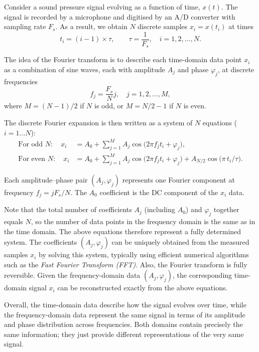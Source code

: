 \documentclass[12pt,a4paper]{article}
\begin{document}
Consider a sound pressure signal evolving as a function of time, $x(t)$. The signal is recorded by a microphone and digitised by an A/D converter with sampling rate \(F_s\). As a result, we obtain $N$ discrete samples $x_i = x(t_i)$ at times
\[
t_i = (i-1) \times \tau, \qquad \tau = \frac{1}{F_s}, \quad i = 1, 2, \ldots, N.
\]

The idea of the Fourier transform is to describe each time-domain data point \(x_i\)
as a combination of sine waves, each with amplitude \(A_j\) and phase \(\varphi_j\),
at discrete frequencies
\[
f_j = \frac{F_s}{N}j, \quad j = 1, 2, \ldots, M,
\]
where \(M = (N - 1)/2\) if \(N\) is odd, or \(M = N/2 - 1\) if \(N\) is even.

The discrete Fourier expansion is then written as a system of $N$ equations ($i = 1\ldots N$):
\begin{align}
\text{For odd } N:\quad
x_i &= A_0 + \sum_{j=1}^{M} A_j \cos\!\big(2\pi f_j t_i + \varphi_j\big), \\[6pt]
\text{For even } N:\quad
x_i &= A_0 + \sum_{j=1}^{M} A_j \cos\!\big(2\pi f_j t_i + \varphi_j\big)
      + A_{N/2}\cos\!\big(\pi\, t_i / \tau\big).
\end{align}

Each amplitude–phase pair \((A_j, \varphi_j)\) represents one Fourier component at frequency \(f_j = jF_s/N\). The $A_0$ coefficient is the DC component of the $x_i$ data.

Note that the total number of coefficients $A_j$ (including $A_0$) and $\varphi_j$ together equals \(N\), so the number of data points in the frequency domain is the same as in the time domain. The above equations therefore represent a fully determined system. The coefficients \((A_j, \varphi_j)\) can be uniquely obtained from the measured samples \(x_i\) by solving this system, typically using efficient numerical algorithms such as the \emph{Fast Fourier Transform (FFT)}. Also, the Fourier transform is fully reversible. Given the frequency-domain data \((A_j, \varphi_j)\), the corresponding time-domain signal \(x_i\) can be reconstructed exactly from the above equations.  

Overall, the time-domain data describe how the signal evolves over time, while the frequency-domain data represent the same signal in terms of its amplitude and phase distribution across frequencies. Both domains contain precisely the same information; they just provide different representations of the very same signal.
\end{document}
